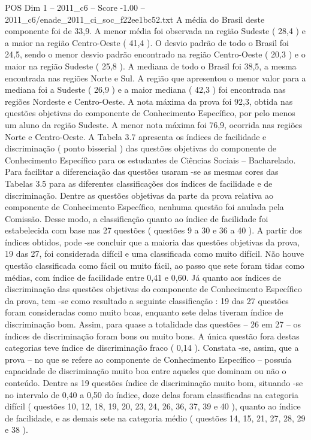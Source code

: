 \begin{textsample}{POS Dim 1 – 2011\_c6 – Score -1.00 – 2011\_c6/enade\_2011\_ci\_soc\_f22ee1bc52.txt}
A média do Brasil deste componente foi de 33,9.
A menor média foi observada na região Sudeste ( 28,4 ) e a maior na região Centro-Oeste ( 41,4 ).
O desvio padrão de todo o Brasil foi 24,5, sendo o menor desvio padrão encontrado na região Centro-Oeste ( 20,3 ) e o maior na região Sudeste ( 25,8 ).
A mediana de todo o Brasil foi 38,5, a mesma encontrada nas regiões Norte e Sul.
A região que apresentou o menor valor para a mediana foi a Sudeste ( 26,9 ) e a maior mediana ( 42,3 ) foi encontrada nas regiões Nordeste e Centro-Oeste.
A nota máxima da prova foi 92,3, obtida nas questões objetivas do componente de Conhecimento Específico, por pelo menos um aluno da região Sudeste.
A menor nota máxima foi 76,9, ocorrida nas regiões Norte e Centro-Oeste.
A Tabela 3.7 apresenta os índices de facilidade e discriminação ( ponto bisserial ) das questões objetivas do componente de Conhecimento Específico para os estudantes de Ciências Sociais – Bacharelado.
Para facilitar a diferenciação das questões usaram -se as mesmas cores das Tabelas 3.5 para as diferentes classificações dos índices de facilidade e de discriminação.
Dentre as questões objetivas da parte da prova relativa ao componente de Conhecimento Específico, nenhuma questão foi anulada pela Comissão.
Desse modo, a classificação quanto ao índice de facilidade foi estabelecida com base nas 27 questões ( questões 9 a 30 e 36 a 40 ).
A partir dos índices obtidos, pode -se concluir que a maioria das questões objetivas da prova, 19 das 27, foi considerada difícil e uma classificada como muito difícil.
Não houve questão classificada como fácil ou muito fácil, ao passo que sete foram tidas como médias, com índice de facilidade entre 0,41 e 0,60.
Já quanto aos índices de discriminação das questões objetivas do componente de Conhecimento Específico da prova, tem -se como resultado a seguinte classificação : 19 das 27 questões foram consideradas como muito boas, enquanto sete delas tiveram índice de discriminação bom.
Assim, para quase a totalidade das questões – 26 em 27 – os índices de discriminação foram bons ou muito bons.
A única questão fora destas categorias teve índice de discriminação fraco ( 0,14 ).
Constata -se, assim, que a prova – no que se refere ao componente de Conhecimento Específico – possuía capacidade de discriminação muito boa entre aqueles que dominam ou não o conteúdo.
Dentre as 19 questões índice de discriminação muito bom, situando -se no intervalo de 0,40 a 0,50 do índice, doze delas foram classificadas na categoria difícil ( questões 10, 12, 18, 19, 20, 23, 24, 26, 36, 37, 39 e 40 ), quanto ao índice de facilidade, e as demais sete na categoria médio ( questões 14, 15, 21, 27, 28, 29 e 38 ).

\end{textsample}
